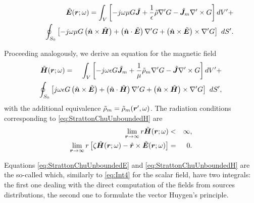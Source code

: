 \begin{eqnarray}
\label{eq:StrattonChuUnboundedE}
& &\tilde{\mbfit{E}}(\mbfit{r}; \omega) =  \int_V \left [ - j\omega\mu G \tilde{\mbfit{J}} + \frac{1}{\epsilon} \tilde{\rho} {\nabla}' G - \tilde{\mbfit{J}}_m {\nabla}' \times G \right ] dV' + \nonumber \\
& & \hspace{.5cm}\oint_{S_0} \left [ - j\omega \mu G \left ( \hat{\mbfit{n}} \times \tilde{\mbfit{H}} \right ) + \left ( \hat{\mbfit{n}} \cdot \tilde{\mbfit{E}}  \right ) {\nabla}'  G + \left ( \hat{\mbfit{n}} \times \tilde{\mbfit{E}} \right ) \times {\nabla}' G \right ] \ dS'.
\end{eqnarray}
\par Proceeding analogously, we derive an equation for the magnetic field
\begin{eqnarray}
\label{eq:StrattonChuUnboundedH}
\tilde{\mbfit{H}}(\mbfit{r}; \omega) &= & \int_V \left [ - j\omega\epsilon G \tilde{\mbfit{J}}_m + \frac{1}{\mu} \tilde{\rho}_m {\nabla}' G - \tilde{\mbfit{J}} {\nabla}' \times G \right ] dV' + \nonumber \\
& & \hspace{-2cm}\oint_{S_0} \left [  j\omega \epsilon G \left ( \hat{\mbfit{n}} \times \tilde{\mbfit{E}} \right ) + \left ( \hat{\mbfit{n}} \cdot \tilde{\mbfit{H}}  \right ) {\nabla}' G + \left ( \hat{\mbfit{n}} \times \tilde{\mbfit{H}} \right ) \times {\nabla}' G\right ] \ dS',
\end{eqnarray} with the additional equivalence $\tilde{\rho}_m = \tilde{\rho}_m(\mbfit{r'},\omega)$. The radiation conditions corresponding to \eqref{eq:StrattonChuUnboundedH} are
\begin{eqnarray}
\lim_{\mbfit{r} \to \infty} r \tilde{\mbfit{H}}(\mbfit{r}; \omega)  &< &\infty,\\
\lim_{\mbfit{r} \to \infty} r \left [ \zeta \tilde{\mbfit{H}}(\mbfit{r}; \omega) - \hat{\mbfit{r}} \times \tilde{\mbfit{E}}(\mbfit{r}; \omega) \right ] &= & 0.
\end{eqnarray}

\par Equations \eqref{eq:StrattonChuUnboundedE} and \eqref{eq:StrattonChuUnboundedH} are the so-called  \cite{StrattonET} which, similarly to \eqref{eq:Int4} for the scalar field, have two integrals: the first one dealing with the direct computation of the fields from sources distributions, the second one to formulate the vector Huygen's principle.

